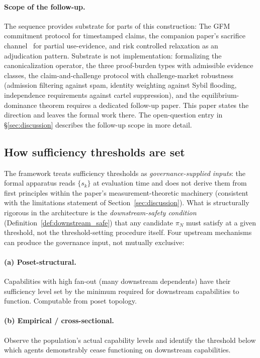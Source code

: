\paragraph{Scope of the follow-up.}
The sequence provides substrate for parts of this construction:
The GFM commitment protocol for timestamped claims, the
companion paper's sacrifice channel~\citep[Revealed~Sacrifice]{lasser2026paper8a}
for partial use-evidence, and risk controlled relaxation as an
adjudication pattern.  Substrate is not
implementation: formalizing the canonicalization operator, the
three proof-burden types with admissible evidence classes, the
claim-and-challenge protocol with challenge-market robustness
(admission filtering against spam, identity weighting against
Sybil flooding, independence requirements against cartel
suppression), and the equilibrium-dominance theorem requires a
dedicated follow-up paper.  This paper states the direction and
leaves the formal work there.  The open-question entry in
\S\ref{sec:discussion} describes the follow-up scope in more
detail.

\subsection{How sufficiency thresholds are set}
\label{sec:threshold_setting}

The framework treats sufficiency thresholds as
\emph{governance-supplied inputs}: the formal apparatus reads
$\{s_k\}$ at evaluation time and does not derive them from
first principles within the paper's measurement-theoretic
machinery (consistent with the limitations statement of
Section~\ref{sec:discussion}).  What is structurally rigorous
in the architecture is the \emph{downstream-safety condition}
(Definition~\ref{def:downstream_safe}) that any candidate
$\pi_N$ must satisfy at a given threshold, not the
threshold-setting procedure itself.  Four upstream mechanisms
can produce the governance input, not mutually exclusive:

\paragraph{(a) Poset-structural.}
Capabilities with high fan-out (many downstream dependents) have
their sufficiency level set by the minimum required for downstream
capabilities to function.  Computable from poset topology.

\paragraph{(b) Empirical / cross-sectional.}
Observe the population's actual capability levels and identify the
threshold below which agents demonstrably cease functioning on
downstream capabilities.

